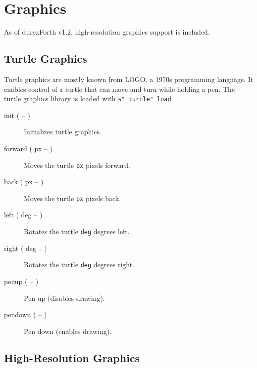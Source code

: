 \chapter{Graphics}

As of durexForth v1.2, high-resolution graphics support is included.

\section{Turtle Graphics}

Turtle graphics are mostly known from LOGO, a 1970s programming language.
It enables control of a turtle that can move and turn while holding a pen.
The turtle graphics library is loaded with \texttt{s" turtle" load}.

\begin{description}
\item[init ( -- )] Initializes turtle graphics.
\item[forward ( px -- )] Moves the turtle \texttt{px} pixels forward.
\item[back ( px -- )] Moves the turtle \texttt{px} pixels back.
\item[left ( deg -- )] Rotates the turtle \texttt{deg} degrees left.
\item[right ( deg -- )] Rotates the turtle \texttt{deg} degrees right.
\item[penup ( -- )] Pen up (disables drawing).
\item[pendown ( -- )] Pen down (enables drawing).
\end{description}

\section{High-Resolution Graphics}

